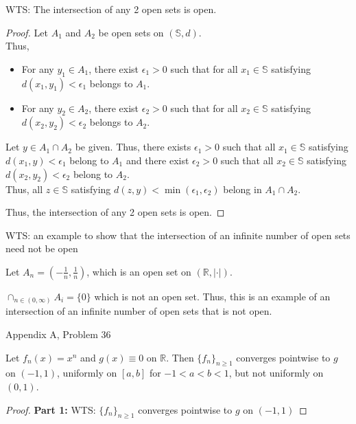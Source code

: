 \documentclass[12pt,letterpaper, onecolumn]{exam}
\newcommand{\real}{\mathbb{R}}
\newcommand{\Sbb}{\mathbb{S}}
\begin{document}
\begin{questions}
\begin{solution}
      WTS: The intersection of any 2 open sets is open. 
      \begin{proof}
        Let $A_1$ and $A_2$ be open sets on $(\Sbb, d)$. \\
        Thus,
          \begin{itemize}
              \item For any $y_1 \in A_1$, there exist $\epsilon_1 > 0$ such that for all $x_1 \in \Sbb$ satisfying $d(x_1, y_1) < \epsilon_1$ belongs to $A_1$.
              \item For any $y_2 \in A_2$, there exist $\epsilon_2 > 0$ such that for all $x_2 \in \Sbb$ satisfying $d(x_2, y_2) < \epsilon_2$ belongs to $A_2$.
          \end{itemize}

          Let $y \in A_1 \cap A_2$ be given. Thus, there exists $\epsilon_1 > 0$ such that all $x_1 \in \Sbb$ satisfying $d(x_1, y) < \epsilon_1$ belong to $A_1$ and there exist $\epsilon_2 > 0$ such that all $x_2 \in \Sbb$ satisfying $d(x_2, y_2) < \epsilon_2$ belong to $A_2$.\\

          Thus, all $z \in \Sbb$ satisfying $d(z, y) < \min(\epsilon_1, \epsilon_2)$ belong in $A_1 \cap A_2$.

          Thus, the intersection of any 2 open sets is open. 
      \end{proof}

      WTS: an example to show that the intersection of an infinite number of open sets need not be open

      Let $A_n = (-\frac{1}{n}, \frac{1}{n})$, which is an open set on $(\real, |\cdot|)$. 
      
      $\cap_{n \in (0, \infty)}A_i = \{0\}$ which is not an open set. Thus, this is an example of an intersection of an infinite number of open sets that is not open. 

    \end{solution}

    \question Appendix A, Problem 36

    Let $f_n(x)=x^n$ and $g(x) \equiv 0$ on $\real$. Then $\{f_n\}_{n\geq 1}$ converges pointwise to $g$ on $(-1, 1)$, uniformly on $[a, b]$ for $-1 <a<b<1$, but not uniformly on $(0, 1)$.


    \begin{solution}
    \begin{proof}
        \textbf{Part 1:} WTS: $\{f_n\}_{n\geq 1}$ converges pointwise to $g$ on $(-1, 1)$


\end{proof}
\end{solution}
\end{questions}
\end{document}
